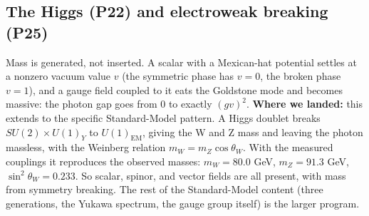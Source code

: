 \subsection{The Higgs (P22) and electroweak breaking (P25)}

Mass is generated, not inserted. A scalar with a Mexican-hat potential settles at a
nonzero vacuum value $v$ (the symmetric phase has $v=0$, the broken phase $v=1$), and a
gauge field coupled to it eats the Goldstone mode and becomes massive: the photon gap
goes from $0$ to exactly $(gv)^2$. \textbf{Where we landed:} this extends to the
specific Standard-Model pattern. A Higgs doublet breaks $SU(2)\times U(1)_Y$ to
$U(1)_{\mathrm{EM}}$, giving the W and Z mass and leaving the photon massless, with the
Weinberg relation $m_W = m_Z\cos\theta_W$. With the measured couplings it reproduces the
observed masses: $m_W = 80.0$ GeV, $m_Z = 91.3$ GeV, $\sin^2\theta_W = 0.233$. So scalar,
spinor, and vector fields are all present, with mass from symmetry breaking. The rest of
the Standard-Model content (three generations, the Yukawa spectrum, the gauge group
itself) is the larger program.
